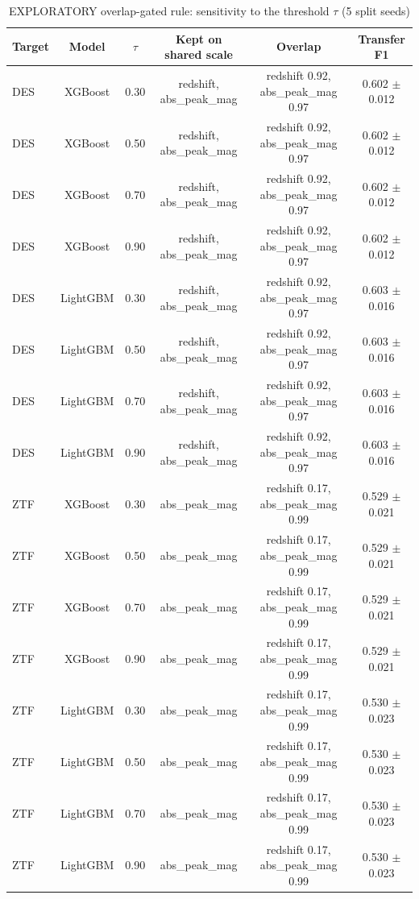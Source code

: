 \begin{table}
\centering
\caption{EXPLORATORY overlap-gated rule: sensitivity to the threshold $\tau$ (5 split seeds)}
\begin{tabular}{lccccc}
\hline
Target & Model & $\tau$ & Kept on shared scale & Overlap & Transfer F1 \\
\hline
DES & XGBoost & 0.30 & redshift, abs\_peak\_mag & redshift 0.92, abs\_peak\_mag 0.97 & 0.602 $\pm$ 0.012 \\
DES & XGBoost & 0.50 & redshift, abs\_peak\_mag & redshift 0.92, abs\_peak\_mag 0.97 & 0.602 $\pm$ 0.012 \\
DES & XGBoost & 0.70 & redshift, abs\_peak\_mag & redshift 0.92, abs\_peak\_mag 0.97 & 0.602 $\pm$ 0.012 \\
DES & XGBoost & 0.90 & redshift, abs\_peak\_mag & redshift 0.92, abs\_peak\_mag 0.97 & 0.602 $\pm$ 0.012 \\
DES & LightGBM & 0.30 & redshift, abs\_peak\_mag & redshift 0.92, abs\_peak\_mag 0.97 & 0.603 $\pm$ 0.016 \\
DES & LightGBM & 0.50 & redshift, abs\_peak\_mag & redshift 0.92, abs\_peak\_mag 0.97 & 0.603 $\pm$ 0.016 \\
DES & LightGBM & 0.70 & redshift, abs\_peak\_mag & redshift 0.92, abs\_peak\_mag 0.97 & 0.603 $\pm$ 0.016 \\
DES & LightGBM & 0.90 & redshift, abs\_peak\_mag & redshift 0.92, abs\_peak\_mag 0.97 & 0.603 $\pm$ 0.016 \\
ZTF & XGBoost & 0.30 & abs\_peak\_mag & redshift 0.17, abs\_peak\_mag 0.99 & 0.529 $\pm$ 0.021 \\
ZTF & XGBoost & 0.50 & abs\_peak\_mag & redshift 0.17, abs\_peak\_mag 0.99 & 0.529 $\pm$ 0.021 \\
ZTF & XGBoost & 0.70 & abs\_peak\_mag & redshift 0.17, abs\_peak\_mag 0.99 & 0.529 $\pm$ 0.021 \\
ZTF & XGBoost & 0.90 & abs\_peak\_mag & redshift 0.17, abs\_peak\_mag 0.99 & 0.529 $\pm$ 0.021 \\
ZTF & LightGBM & 0.30 & abs\_peak\_mag & redshift 0.17, abs\_peak\_mag 0.99 & 0.530 $\pm$ 0.023 \\
ZTF & LightGBM & 0.50 & abs\_peak\_mag & redshift 0.17, abs\_peak\_mag 0.99 & 0.530 $\pm$ 0.023 \\
ZTF & LightGBM & 0.70 & abs\_peak\_mag & redshift 0.17, abs\_peak\_mag 0.99 & 0.530 $\pm$ 0.023 \\
ZTF & LightGBM & 0.90 & abs\_peak\_mag & redshift 0.17, abs\_peak\_mag 0.99 & 0.530 $\pm$ 0.023 \\

\end{tabular}
\end{table}
